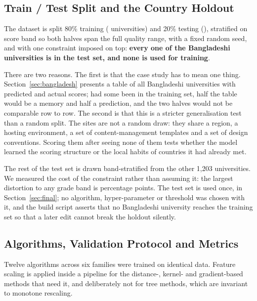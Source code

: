 \documentclass[11pt,a4paper]{article}
\begin{document}
\subsection{Train / Test Split and the Country Holdout}
\label{sec:split}

The dataset is split 80\% training (\nTrain{} universities) and 20\% testing (\nTest{}), stratified
on score band so both halves span the full quality range, with a fixed random seed, and with one
constraint imposed on top: \textbf{every one of the \nBD{} Bangladeshi universities is in the test
set, and none is used for training}.

There are two reasons. The first is that the case study has to mean one thing.
Section~\ref{sec:bangladesh} presents a table of all \nBD{} Bangladeshi universities with predicted
and actual scores; had some been in the training set, half the table would be a memory and half a
prediction, and the two halves would not be comparable row to row. The second is that this is a
stricter generalisation test than a random split. The \nBD{} sites are not a random draw: they share
a region, a hosting environment, a set of content-management templates and a set of design
conventions. Scoring them after seeing none of them tests whether the model learned the scoring
structure or the local habits of countries it had already met.

The rest of the test set is drawn band-stratified from the other 1,203 universities. We measured the
cost of the constraint rather than assuming it: the largest distortion to any grade band is
\maxDrift{} percentage points. The test set is used once, in Section~\ref{sec:final}; no algorithm,
hyper-parameter or threshold was chosen with it, and the build script asserts that no Bangladeshi
university reaches the training set so that a later edit cannot break the holdout silently.

\begin{table}[H]\centering\small
\caption{Stratification after the country holdout. ``Drift'' is the test-set share of a band minus
its share of the full dataset.}

\end{table}

\subsection{Algorithms, Validation Protocol and Metrics}

Twelve algorithms across six families were trained on identical data. Feature scaling is applied
inside a pipeline for the distance-, kernel- and gradient-based methods that need it, and
deliberately not for tree methods, which are invariant to monotone rescaling.
\end{document}
